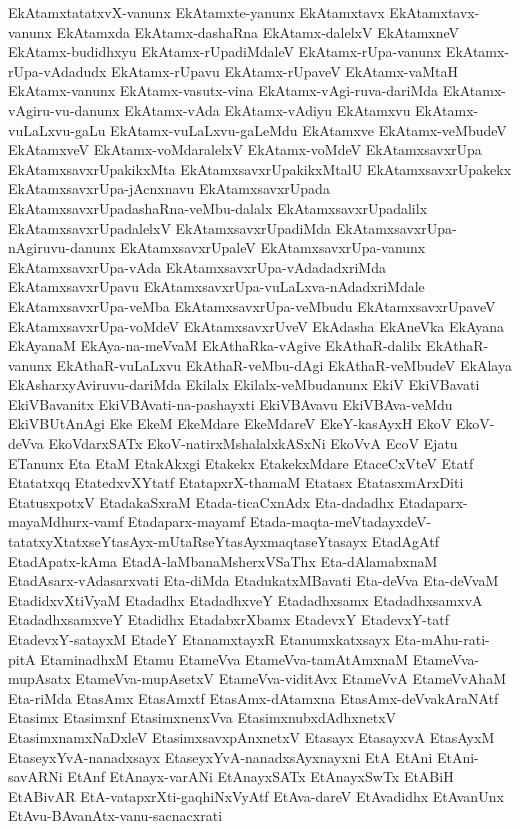 {EkAtamxtatatxvX-vanunx
EkAtamxte-yanunx
EkAtamxtavx
EkAtamxtavx-vanunx
EkAtamxda
EkAtamx-dashaRna
EkAtamx-dalelxV
EkAtamxneV
EkAtamx-budidhxyu
EkAtamx-rUpadiMdaleV
EkAtamx-rUpa-vanunx
EkAtamx-rUpa-vAdadudx
EkAtamx-rUpavu
EkAtamx-rUpaveV
EkAtamx-vaMtaH
EkAtamx-vanunx
EkAtamx-vasutx-vina
EkAtamx-vAgi-ruva-dariMda
EkAtamx-vAgiru-vu-danunx
EkAtamx-vAda
EkAtamx-vAdiyu
EkAtamxvu
EkAtamx-vuLaLxvu-gaLu
EkAtamx-vuLaLxvu-gaLeMdu
EkAtamxve
EkAtamx-veMbudeV
EkAtamxveV
EkAtamx-voMdaralelxV
EkAtamx-voMdeV
EkAtamxsavxrUpa
EkAtamxsavxrUpakikxMta
EkAtamxsavxrUpakikxMtalU
EkAtamxsavxrUpakekx
EkAtamxsavxrUpa-jAcnxnavu
EkAtamxsavxrUpada
EkAtamxsavxrUpadashaRna-veMbu-dalalx
EkAtamxsavxrUpadalilx
EkAtamxsavxrUpadalelxV
EkAtamxsavxrUpadiMda
EkAtamxsavxrUpa-nAgiruvu-danunx
EkAtamxsavxrUpaleV
EkAtamxsavxrUpa-vanunx
EkAtamxsavxrUpa-vAda
EkAtamxsavxrUpa-vAdadadxriMda
EkAtamxsavxrUpavu
EkAtamxsavxrUpa-vuLaLxva-nAdadxriMdale
EkAtamxsavxrUpa-veMba
EkAtamxsavxrUpa-veMbudu
EkAtamxsavxrUpaveV
EkAtamxsavxrUpa-voMdeV
EkAtamxsavxrUveV
EkAdasha
EkAneVka
EkAyana
EkAyanaM
EkAya-na-meVvaM
EkAthaRka-vAgive
EkAthaR-dalilx
EkAthaR-vanunx
EkAthaR-vuLaLxvu
EkAthaR-veMbu-dAgi
EkAthaR-veMbudeV
EkAlaya
EkAsharxyAviruvu-dariMda
Ekilalx
Ekilalx-veMbudanunx
EkiV
EkiVBavati
EkiVBavanitx
EkiVBAvati-na-pashayxti
EkiVBAvavu
EkiVBAva-veMdu
EkiVBUtAnAgi
Eke
EkeM
EkeMdare
EkeMdareV
EkeY-kasAyxH
EkoV
EkoV-deVva
EkoVdarxSATx
EkoV-natirxMshalalxkASxNi
EkoVvA
EcoV
Ejatu
ETanunx
Eta
EtaM
EtakAkxgi
Etakekx
EtakekxMdare
EtaceCxVteV
Etatf
Etatatxqq
EtatedxvXYtatf
EtatapxrX-thamaM
Etatasx
EtatasxmArxDiti
EtatusxpotxV
EtadakaSxraM
Etada-ticaCxnAdx
Eta-dadadhx
Etadaparx-mayaMdhurx-vamf
Etadaparx-mayamf
Etada-maqta-meVtadayxdeV-tatatxyXtatxseYtasAyx-mUtaRseYtasAyxmaqtaseYtasayx
EtadAgAtf
EtadApatx-kAma
EtadA-laMbanaMsherxVSaThx
Eta-dAlamabxnaM
EtadAsarx-vAdasarxvati
Eta-diMda
EtadukatxMBavati
Eta-deVva
Eta-deVvaM
EtadidxvXtiVyaM
Etadadhx
EtadadhxveY
Etadadhxsamx
EtadadhxsamxvA
EtadadhxsamxveY
Etadidhx
EtadabxrXbamx
EtadevxY
EtadevxY-tatf
EtadevxY-satayxM
EtadeY
EtanamxtayxR
Etanumxkatxsayx
Eta-mAhu-rati-pitA
EtaminadhxM
Etamu
EtameVva
EtameVva-tamAtAmxnaM
EtameVva-mupAsatx
EtameVva-mupAsetxV
EtameVva-viditAvx
EtameVvA
EtameVvAhaM
Eta-riMda
EtasAmx
EtasAmxtf
EtasAmx-dAtamxna
EtasAmx-deVvakAraNAtf
Etasimx
Etasimxnf
EtasimxnenxVva
EtasimxnubxdAdhxnetxV
EtasimxnamxNaDxleV
EtasimxsavxpAnxnetxV
Etasayx
EtasayxvA
EtasAyxM
EtaseyxYvA-nanadxsayx
EtaseyxYvA-nanadxsAyxnayxni
EtA
EtAni
EtAni-savARNi
EtAnf
EtAnayx-varANi
EtAnayxSATx
EtAnayxSwTx
EtABiH
EtABivAR
EtA-vatapxrXti-gaqhiNxVyAtf
EtAva-dareV
EtAvadidhx
EtAvanUnx
EtAvu-BAvanAtx-vanu-sacnacxrati
}

